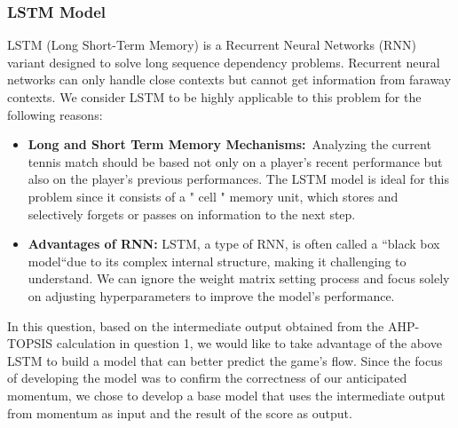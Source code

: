 \subsubsection{LSTM Model}
\indent LSTM (Long Short-Term Memory) is a Recurrent Neural Networks (RNN) variant designed to solve long sequence dependency problems. Recurrent neural networks can only handle close contexts but cannot get information from faraway contexts. We consider LSTM to be highly applicable to this problem for the following reasons:
\begin{itemize}
    \item \textbf{Long and Short Term Memory Mechanisms:}\ Analyzing the current tennis match should be based not only on a player's recent performance but also on the player's previous performances. The LSTM model is ideal for this problem since it consists of a " cell " memory unit, which stores and selectively forgets or passes on information to the next step. 
    \item \textbf{Advantages of RNN:}
    LSTM, a type of RNN, is often called a “black box model“due to its complex internal structure, making it challenging to understand. We can ignore the weight matrix setting process and focus solely on adjusting hyperparameters to improve the model's performance.
\end{itemize}
In this question, based on the intermediate output obtained from the AHP-TOPSIS calculation in question 1, we would like to take advantage of the above LSTM to build a model that can better predict the game's flow. Since the focus of developing the model was to confirm the correctness of our anticipated momentum, we chose to develop a base model that uses the intermediate output from momentum as input and the result of the score as output.

